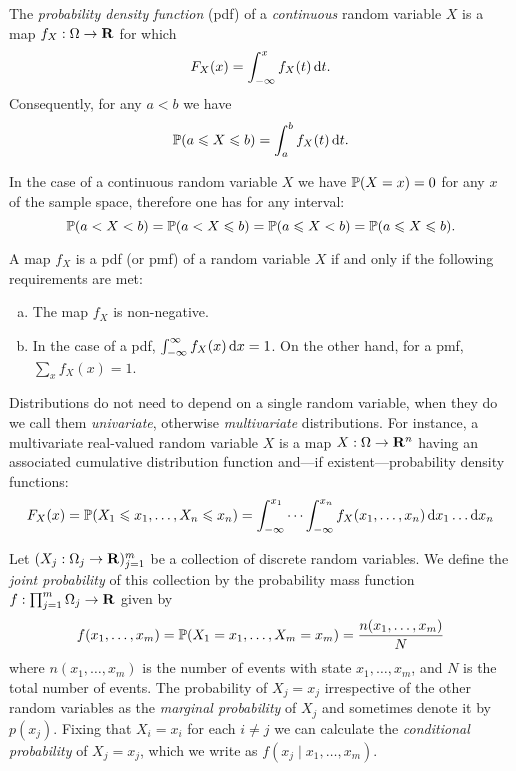 \begin{definition}
\label{def:probability-mass-function}
The \emph{probability density function} (pdf) of a \emph{continuous} random variable
\(X\) is a map \(f_X: \Omega \to \mathbf{R}\) for which
\[
F_X(x) = \int_{-\infty}^x f_X(t)\, \mathrm{d} t.
\]
Consequently, for any \(a < b\) we have
\[
\operatorname{\mathbb{P}}(a \leqslant X \leqslant b) = \int_a^b f_X(t)\, \mathrm{d} t.
\]
\end{definition}

\begin{remark}
\label{rem:interval-probability-continuous-random-variable}
In the case of a continuous random variable \(X\) we have \(\operatorname{\mathbb{P}}(X = x) = 0\)
for any \(x\) of the sample space, therefore one has for any interval:
\[
\operatorname{\mathbb{P}}(a < X < b)
= \operatorname{\mathbb{P}}(a < X \leqslant b)
= \operatorname{\mathbb{P}}(a \leqslant X < b)
= \operatorname{\mathbb{P}}(a \leqslant X \leqslant b).
\]
\end{remark}

\begin{theorem}
\label{thm:prob-density-fn-equivalent-conditions}
A map \(f_X\) is a pdf (or pmf) of a random variable \(X\) if and only if the
following requirements are met:
\begin{enumerate}[(a)]\setlength\itemsep{0em}
\item The map \(f_X\) is non-negative.
\item In the case of a pdf, \(\int_{-\infty}^{\infty} f_X(x)\, \mathrm{d} x = 1\). On
  the other hand, for a pmf, \(\sum_x f_X(x) = 1\).
\end{enumerate}
\end{theorem}

\begin{notation}
\label{not:univariate-multivariate-distributions}
Distributions do not need to depend on a single random variable, when they do we
call them \emph{univariate}, otherwise \emph{multivariate} distributions. For
instance, a multivariate real-valued random variable \(X\) is a map
\(X: \Omega \to \mathbf{R}^n\) having an associated cumulative distribution function
and---if existent---probability density functions:
\[
F_X(x) = \operatorname{\mathbb{P}}(X_1 \leqslant x_1, \dots, X_n \leqslant x_n)
= \int_{-\infty}^{x_1} \cdots \int_{-\infty}^{x_n} f_X(x_1, \dots, x_n)\,
\mathrm{d} x_1 \dots \mathrm{d} x_n
\]
\end{notation}

\begin{definition}
\label{def:joint-probability}
Let \((X_j: \Omega_j \to \mathbf{R})_{j=1}^m\) be a collection of discrete random variables. We
define the \emph{joint probability} of this collection by the probability mass
function \(f: \prod_{j=1}^m \Omega_j \to \mathbf{R}\) given by
\[
f(x_1, \dots, x_m)
= \operatorname{\mathbb{P}}(X_1 = x_1, \dots, X_m = x_m)
= \frac{n(x_1, \dots, x_m)}{N}
\]
where \(n(x_1, \dots, x_m)\) is the number of events with state
\(x_1, \dots, x_m\), and \(N\) is the total number of events. The probability of
\(X_j = x_j\) irrespective of the other random variables as the \emph{marginal
  probability} of \(X_j\) and sometimes denote it by \(p(x_j)\). Fixing that
\(X_i = x_i\) for each \(i \neq j\) we can calculate the \emph{conditional
  probability} of \(X_j = x_j\), which we write as
\(f(x_j \mid x_1, \dots, x_m)\).
\end{definition}

